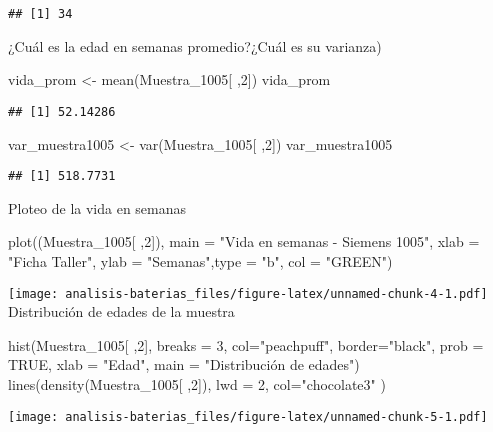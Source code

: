 \documentclass[
]{article}
\newenvironment{Shaded}{\begin{snugshade}}{\end{snugshade}}
\newcommand{\AttributeTok}[1]{\textcolor[rgb]{0.77,0.63,0.00}{#1}}
\newcommand{\ConstantTok}[1]{\textcolor[rgb]{0.00,0.00,0.00}{#1}}
\newcommand{\DecValTok}[1]{\textcolor[rgb]{0.00,0.00,0.81}{#1}}
\newcommand{\FunctionTok}[1]{\textcolor[rgb]{0.00,0.00,0.00}{#1}}
\newcommand{\NormalTok}[1]{#1}
\newcommand{\OtherTok}[1]{\textcolor[rgb]{0.56,0.35,0.01}{#1}}
\newcommand{\StringTok}[1]{\textcolor[rgb]{0.31,0.60,0.02}{#1}}
\begin{document}
\begin{verbatim}
## [1] 34
\end{verbatim}

¿Cuál es la edad en semanas promedio?¿Cuál es su varianza)

\begin{Shaded}
\begin{Highlighting}[]
\NormalTok{vida\_prom }\OtherTok{\textless{}{-}} \FunctionTok{mean}\NormalTok{(Muestra\_1005[ ,}\DecValTok{2}\NormalTok{])}
\NormalTok{vida\_prom}
\end{Highlighting}
\end{Shaded}

\begin{verbatim}
## [1] 52.14286
\end{verbatim}

\begin{Shaded}
\begin{Highlighting}[]
\NormalTok{var\_muestra1005 }\OtherTok{\textless{}{-}} \FunctionTok{var}\NormalTok{(Muestra\_1005[ ,}\DecValTok{2}\NormalTok{])}
\NormalTok{var\_muestra1005}
\end{Highlighting}
\end{Shaded}

\begin{verbatim}
## [1] 518.7731
\end{verbatim}

Ploteo de la vida en semanas

\begin{Shaded}
\begin{Highlighting}[]
\FunctionTok{plot}\NormalTok{((Muestra\_1005[ ,}\DecValTok{2}\NormalTok{]), }\AttributeTok{main =} \StringTok{"Vida en semanas {-} Siemens 1005"}\NormalTok{, }\AttributeTok{xlab =} \StringTok{"Ficha Taller"}\NormalTok{, }\AttributeTok{ylab =} \StringTok{"Semanas"}\NormalTok{,}\AttributeTok{type =} \StringTok{"b"}\NormalTok{, }\AttributeTok{col =} \StringTok{"GREEN"}\NormalTok{)}
\end{Highlighting}
\end{Shaded}

\texttt{[image: analisis-baterias\_files/figure-latex/unnamed-chunk-4-1.pdf]}
Distribución de edades de la muestra

\begin{Shaded}
\begin{Highlighting}[]
\FunctionTok{hist}\NormalTok{(Muestra\_1005[ ,}\DecValTok{2}\NormalTok{],}
     \AttributeTok{breaks =} \DecValTok{3}\NormalTok{, }
     \AttributeTok{col=}\StringTok{"peachpuff"}\NormalTok{,}
     \AttributeTok{border=}\StringTok{"black"}\NormalTok{,}
     \AttributeTok{prob =} \ConstantTok{TRUE}\NormalTok{, }
     \AttributeTok{xlab =} \StringTok{"Edad"}\NormalTok{, }
     \AttributeTok{main =} \StringTok{"Distribución de edades"}\NormalTok{)}
\FunctionTok{lines}\NormalTok{(}\FunctionTok{density}\NormalTok{(Muestra\_1005[ ,}\DecValTok{2}\NormalTok{]),}
    \AttributeTok{lwd =} \DecValTok{2}\NormalTok{,}
    \AttributeTok{col=}\StringTok{"chocolate3"}
\NormalTok{                                            )}
\end{Highlighting}
\end{Shaded}

\texttt{[image: analisis-baterias\_files/figure-latex/unnamed-chunk-5-1.pdf]}
\end{document}

